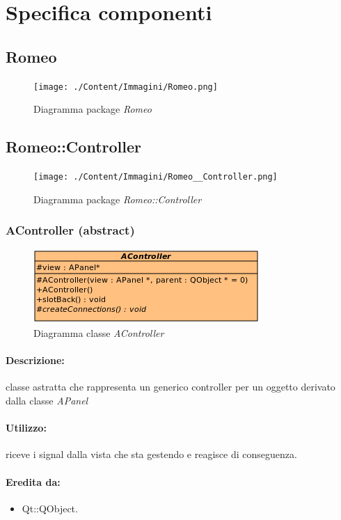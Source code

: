 \section{Specifica componenti}
\subsection{Romeo}
	\begin{figure} [!h]
		\centering
		\texttt{[image: ./Content/Immagini/Romeo.png]}
		\caption{Diagramma package \textsl{Romeo}}
	\end{figure}
\subsection{Romeo::Controller}
	\begin{figure} [!h]
		\centering
		\texttt{[image: ./Content/Immagini/Romeo\_\_Controller.png]}
		\caption{Diagramma package \textsl{Romeo::Controller}}
	\end{figure}
	\subsubsection{AController (abstract)}
	\begin{figure}[!h]
		\centering
		\includegraphics[scale=2.75]{./Content/Immagini/controller/AController}
		\caption{Diagramma classe \textsl{AController}}
	\end{figure}
	\paragraph{Descrizione:} classe astratta che rappresenta un generico controller per un oggetto derivato dalla classe \textsl{APanel}
	\paragraph{Utilizzo:} riceve i signal\g{} dalla vista che sta gestendo e reagisce di conseguenza.
	\paragraph{Eredita da:}
		\begin{itemize}
			\item Qt::QObject.
		\end{itemize}
